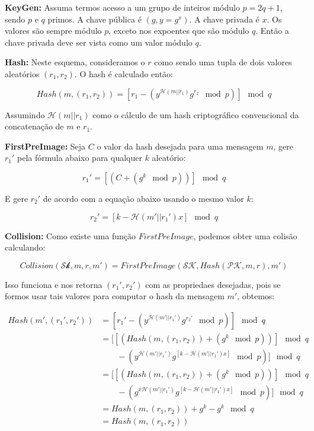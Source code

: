 \documentclass[a4paper]{article}
\begin{document}
\textbf{KeyGen: }Assuma termos acesso a um grupo de inteiros módulo
$p=2q+1$, sendo $p$ e $q$ primos. A chave pública é $(g, y=g^x)$. A
chave privada é $x$. Os valores são sempre módulo $p$, exceto nos
expoentes que são módulo $q$. Então a chave privada deve ser vista
como um valor módulo $q$.

\textbf{Hash: }Neste esquema, consideramos o $r$ como sendo uma tupla
de dois valores aleatórios $(r_1, r_2)$. O hash é calculado então:

$$ Hash(m, (r_1, r_2)) = \left[r_1-(y^{\mathcal{H}(m||r_1)}g^{r_2}
  \mod p)\right] \mod q
$$

Assumindo $\mathcal{H}(m||r_1)$ como o cálculo de um hash
criptográfico convencional da concatenação de $m$ e $r_1$.

\textbf{FirstPreImage:} Seja $C$ o valor da hash desejada para uma
mensagem $m$, gere $r_1'$ pela fórmula abaixo para qualquer $k$
aleatório:

$$
r_1' = \left[(C + (g^k \mod p))\right] \mod q
$$

E gere $r_2'$ de acordo com a equação abaixo usando o mesmo valor $k$:

$$
r_2' = \left[k-\mathcal{H}(m'||r_1')x\right] \mod q
$$

\textbf{Collision:} Como existe uma função $FirstPreImage$, podemos
obter uma colisão calculando:

$$ Collision(\mathcal{Sk}, m, r, m') = FirstPreImage(\mathcal{SK},
Hash(\mathcal{PK}, m, r), m')
$$

Isso funciona e nos retorna $(r_1', r_2')$ com as propriedaes
desejadas, pois se formos usar tais valores para computar o hash da
mensagem $m'$, obtemos:

\begin{equation}
\begin{split}
  Hash(m', (r_1', r_2')) &= \left[r_1'-(y^{\mathcal{H}(m'||r_1')}g^{r_2'} \mod p)\right] \mod q\\
  &=\big[\left[(Hash(m, (r_1, r_2)) + (g^k \mod p))\right] \mod q\\
    &\qquad-(y^{\mathcal{H}(m'||r_1')}g^{[k-\mathcal{H}(m'||r_1')x]} \mod p)\big] \mod q\\
  &=\big[\left[(Hash(m, (r_1, r_2)) + (g^k \mod p))\right] \mod q\\
    &\qquad-(g^{x\mathcal{H}(m'||r_1')}g^{[k-\mathcal{H}(m'||r_1')x]} \mod p)\big] \mod q\\
  &= Hash(m, (r_1, r_2)) + g^k - g^k \mod q\\
  &= Hash(m, (r_1, r_2))
\end{split}
\end{equation}
\end{document}
